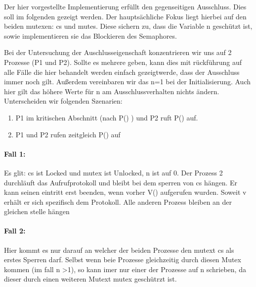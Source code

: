 Der hier vorgestellte Implementierung erfüllt den gegenseitigen Ausschluss. Dies soll im folgenden gezeigt werden. Der hauptsächliche Fokus liegt hierbei auf den beiden mutexen: cs und mutes. Diese sichern zu, dass die Variable n geschützt ist, sowie implementieren sie das Blockieren des Semaphores.

Bei der Untersuchung der Auschlusseigenschaft konzentrieren wir uns auf 2 Prozesse (P1 und P2). Sollte es mehrere geben, kann dies mit rückführung auf alle Fälle die hier behandelt werden einfach gezeigtwerde, dass der Ausschluss immer noch gilt. Außerdem vereinbaren wir das n=1 bei der Initialisierung. Auch hier gilt das höhere Werte für n am Ausschlussverhalten nichts ändern. Unterscheiden wir folgenden Szenarien:

\begin{enumerate}
\item P1 im kritischen Abschnitt (nach P() ) und P2 ruft P() auf.
\item P1 und P2 rufen zeitgleich P() auf 
\end{enumerate}

\paragraph*{Fall 1:}
 Es glit:  cs ist Locked und mutex ist Unlocked, n ist auf 0. Der Prozess 2 durchläuft das Aufrufprotokoll und bleibt bei dem sperren von cs hängen. Er kann seinen eintritt erst beenden, wenn vorher V() aufgerufen wurden. Soweit v erhält er sich spezifisch dem Protokoll. Alle anderen Prozess bleiben an der gleichen stelle hängen

\paragraph*{Fall 2:}

Hier kommt es nur darauf an welcher der beiden Prozesse den mutext cs als erstes Sperren darf. Selbst wenn beie Prozesse gleichzeitig durch diesen Mutex kommen (im fall n \textgreater 1), so kann imer nur einer der Prozesse auf n schrieben, da dieser durch einen weiteren Mutext mutex geschütrzt ist.